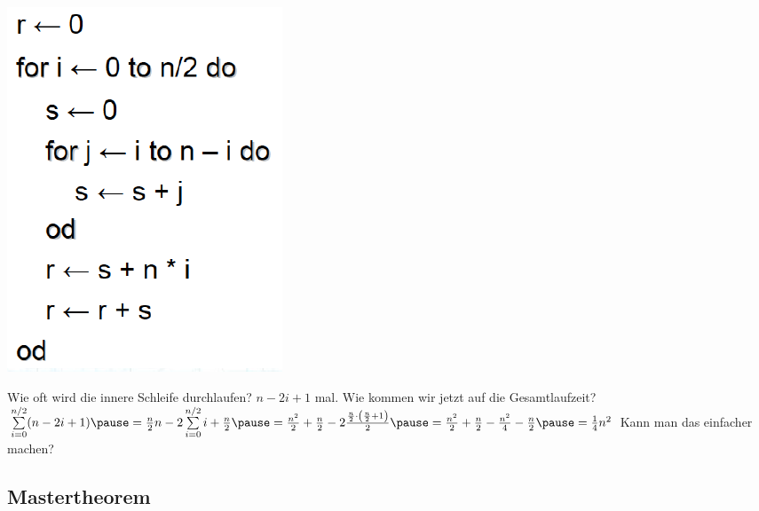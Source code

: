 \begin{frame}
	\includegraphics[scale=0.5]{images/okalk_algo.png}
	
	\begin{itemize}
		\pitem Wie oft wird die innere Schleife durchlaufen? \pause $n-2i+1$ mal.
		\pitem Wie kommen wir jetzt auf die Gesamtlaufzeit?
		\pitem $\sum\limits_{i=0}^{n/2} (n-2i+1) \ip = \frac{n}{2}n -2\sum\limits_{i=0}^{n/2}i+\frac{n}{2} \ip = \frac{n^2}{2}+\frac{n}{2}-2\frac{\frac{n}{2}\cdot \left(\frac{n}{2}+1\right)}{2} \ip = \frac{n^2}{2}+\frac{n}{2}-\frac{n^2}{4}-\frac{n}{2}\ip = \frac{1}{4}n^2$
		\pitem Kann man das einfacher machen?
	\end{itemize}
\end{frame}


\subsection{Mastertheorem}

